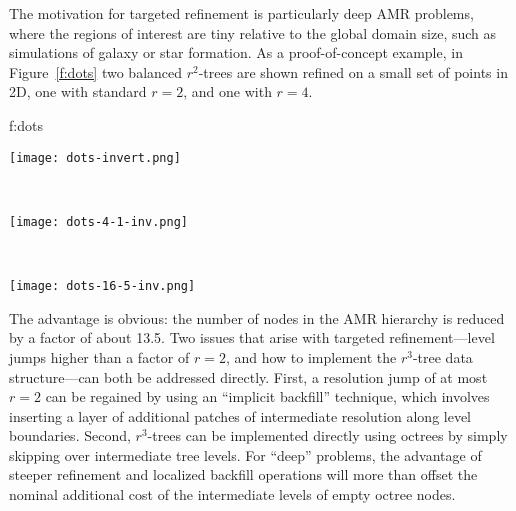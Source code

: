 \documentclass[11pt,letterpaper]{article}
\begin{document}
The motivation for targeted refinement is 
particularly deep AMR problems, where the regions of interest are tiny
relative to the global domain size, such as simulations of galaxy or
star formation.  As a proof-of-concept example, in Figure~\ref{f:dots}
two balanced $r^2$-trees are shown refined on a small set of points in 2D, one
with standard $r=2$, and one with $r=4$.


{f:dots}{
\begin{minipage}{\textwidth}
\begin{center}
\begin{minipage}{2.0in}
\texttt{[image: dots-invert.png]}
\end{minipage} \ 
\begin{minipage}{2.0in}
\texttt{[image: dots-4-1-inv.png]}
\end{minipage} \ 
\begin{minipage}{2.0in}
\texttt{[image: dots-16-5-inv.png]}
\end{minipage}
\end{center}
\end{minipage}}

The advantage is obvious: the number of nodes in the AMR hierarchy is
reduced by a factor of about 13.5.  Two issues that arise
with targeted refinement---level jumps higher than a factor of $r=2$,
and how to implement the $r^3$-tree data structure---can both be
addressed directly.  First, a resolution jump of at most $r=2$ can be
regained by using an ``implicit backfill'' technique, which involves
inserting a layer of additional patches of intermediate resolution
along level boundaries.  Second, $r^3$-trees can be implemented
directly using octrees by simply skipping over intermediate tree
levels.  For ``deep'' problems, the advantage of steeper refinement
and localized backfill operations will more than offset the nominal additional
cost of the intermediate levels of empty octree nodes.
\end{document}
